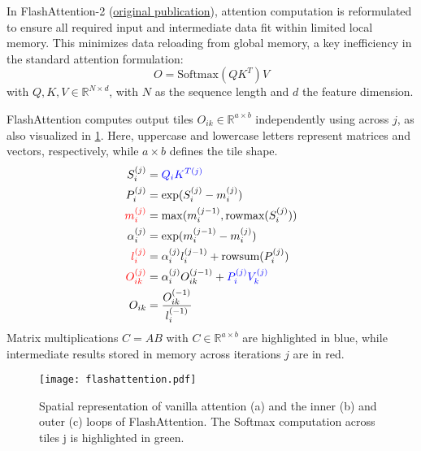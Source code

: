 \documentclass{article}
\begin{document}


\noindent In FlashAttention-2 (\href{https://arxiv.org/abs/2307.08691}{original publication}), attention computation is reformulated to ensure all required input and intermediate data fit within limited local memory.
This minimizes data reloading from global memory, a key inefficiency in the standard attention formulation:
$$ O = \mathrm{Softmax}(Q K^T)V $$
with $Q, K, V \in \mathbb{R}^{N \times d}$, with $N$ as the sequence length and $d$ the feature dimension.

FlashAttention computes output tiles $O_{ik} \in \mathbb{R}^{a \times b}$ independently using  across $j$, as also visualized in \cref{fig:flashattention}.
Here, uppercase and lowercase letters represent matrices and vectors, respectively, while $a \times b$ defines the tile shape.
\begin{align}
  S_i^{(j)} &= \textcolor{blue}{Q_i K^{T(j)}} \label{eq:s} \\
  P_i^{(j)} &= \exp(S_i^{(j)} - m_i^{(j)}) \label{eq:p} \\
  \textcolor{red}{m_i^{(j)}} &= \max(m_i^{(j-1)}, \text{rowmax} (S_i^{(j)})) \label{eq:m} \\
  \alpha_i^{(j)} &= \exp(m_i^{(j-1)} - m_i^{(j)}) \label{eq:alpha} \\
  \textcolor{red}{l_i^{(j)}} &= \alpha_i^{(j)} l_i^{(j-1)} + \text{rowsum}(P_i^{(j)}) \label{eq:l} \\
  \textcolor{red}{O_{ik}^{(j)}} &= \alpha_i^{(j)} O_{ik}^{(j-1)} + \textcolor{blue}{P_i^{(j)} V_k^{(j)}} \label{eq:oikj} \\
  O_{ik} &= \frac{O_{ik}^{(-1)}}{l_i^{(-1)}} \label{eq:oik}
\end{align}
Matrix multiplications $C=AB$ with $C \in \mathbb{R}^{a \times b}$ are highlighted in blue, while intermediate results stored in memory across iterations $j$ are in red.

\begin{figure}
  \centering
  \texttt{[image: flashattention.pdf]}
  \caption{
    Spatial representation of vanilla attention (a) and the inner (b) and outer (c) loops of FlashAttention.
    The Softmax computation across tiles j is highlighted in green.
  }
  \label{fig:flashattention}
\end{figure}
\end{document}
